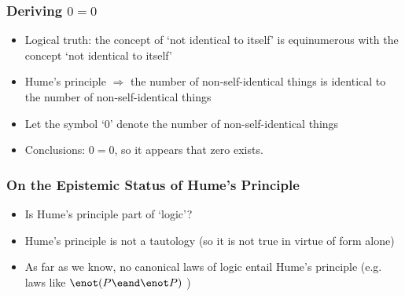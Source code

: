 \begin{frame}
\frametitle{Deriving $0=0$}

\begin{itemize}%

\item Logical truth: the concept of `not identical to itself' is equinumerous with the concept `not identical to itself'

\item Hume's principle $\Rightarrow$ the number of non-self-identical things is identical to the number of non-self-identical things

\item Let the symbol `0' denote the number of non-self-identical things

\item Conclusions: $0=0$, so it appears that zero exists. 

\end{itemize}
\end{frame}

\begin{frame}
\frametitle{On the Epistemic Status of Hume's Principle}

\begin{itemize}[<+->]



\item Is Hume's principle part of `logic'?

\item Hume's principle is not a tautology (so it is not true in virtue of form alone)

\item As far as we know, no canonical laws of logic entail Hume's principle (e.g. laws like $\enot(P \eand \enot P)$ )

\end{itemize}
\end{frame}

\iffalse %

